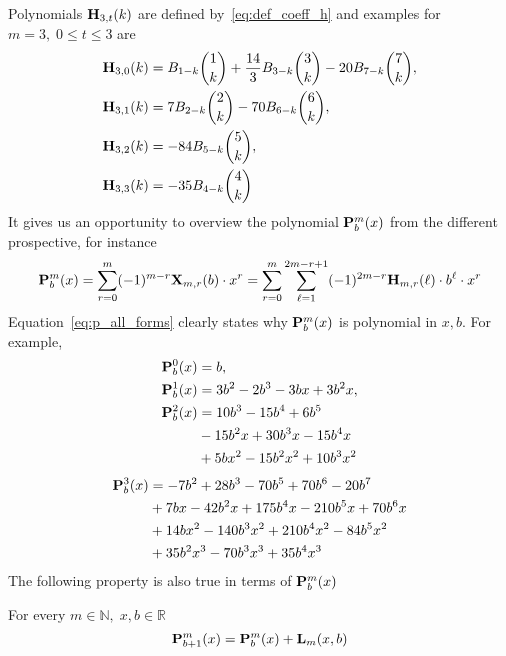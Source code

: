 Polynomials ${\mathbf{H}} \sb{3,t} (k)$ are defined by~\eqref{eq:def_coeff_h} and examples for $m=3, \; 0\leq t \leq 3$ are
\begin{equation*}
    \begin{split}
        {\mathbf{H}} \sb{3,0} (k)
        &={B}\sb{1-k} \binom{1}{k} + \frac{14}{3} {B}\sb{3-k} \binom{3}{k} - 20 {B}\sb{7 - k} \binom{7}{k}, \\
        {\mathbf{H}} \sb{3,1} (k)
        &=7 {B}\sb{2-k} \binom{2}{k} - 70 {B}\sb{6-k} \binom{6}{k}, \\
        {\mathbf{H}} \sb{3,2} (k)
        &=-84 {B}\sb{5-k} \binom{5}{k}, \\
        {\mathbf{H}} \sb{3,3} (k)
        &=-35 {B}\sb{4-k} \binom{4}{k}
    \end{split}
\end{equation*}
It gives us an opportunity to overview the polynomial ${\mathbf{P}}\sp{m} \sb{b}(x)$ from the different prospective,
for instance
\begin{equation}
    \label{eq:p_all_forms}
    {\mathbf{P}}\sp{m} \sb{b}(x)
    =\sum_{r=0}^{m} (-1)^{m-r} {\mathbf{X}}\sb{m,r} (b) \cdot x^r
    =\sum_{r=0}^{m} \sum_{\ell=1}^{2m-r+1} (-1)^{2m-r} {\mathbf{H}} \sb{m,r} (\ell) \cdot b^\ell \cdot x^r
\end{equation}
Equation~\eqref{eq:p_all_forms} clearly states why ${\mathbf{P}}\sp{m} \sb{b}(x)$ is polynomial in $x,b$.
For example,
\begin{equation*}
    \begin{split}
        {\mathbf{P}}\sp{0} \sb{b}(x)
        &=b, \\
        {\mathbf{P}}\sp{1} \sb{b}(x)
        &=3 b^2 - 2 b^3 - 3 b x + 3 b^2 x, \\
        {\mathbf{P}}\sp{2} \sb{b}(x)
        &=10 b^3 - 15 b^4 + 6 b^5 \\
        &- 15 b^2 x + 30 b^3 x - 15 b^4 x \\
        &+ 5 b x^2 - 15 b^2 x^2 + 10 b^3 x^2
    \end{split}
\end{equation*}
\begin{equation*}
    \begin{split}
        {\mathbf{P}}\sp{3} \sb{b}(x)
        &=-7 b^2 + 28 b^3 - 70 b^5 + 70 b^6 - 20 b^7 \\
        &+ 7 b x - 42 b^2 x + 175 b^4 x - 210 b^5 x + 70 b^6 x \\
        &+ 14 b x^2 - 140 b^3 x^2 + 210 b^4 x^2 - 84 b^5 x^2 \\
        &+ 35 b^2 x^3 - 70 b^3 x^3 + 35 b^4 x^3
    \end{split}
\end{equation*}
The following property is also true in terms of ${\mathbf{P}}\sp{m} \sb{b}(x)$
\begin{ppty}
    \label{prop_p_identity}
    For every $m\in \mathbb{N}, \; x,b\in\mathbb{R}$
    \begin{equation*}
        {\mathbf{P}}\sp{m} \sb{b+1}(x) = {\mathbf{P}}\sp{m} \sb{b}(x) + {\mathbf{L}}\sb{m}(x,b)
    \end{equation*}
\end{ppty}
